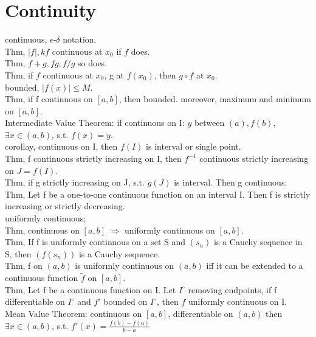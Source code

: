 \documentclass[paper=a4, fontsize=11pt]{scrartcl} %
\numberwithin{equation}{section} %
\numberwithin{figure}{section} %
\numberwithin{table}{section} %
\begin{document}
\section{Continuity}
continuous, $\epsilon$-$\delta$ notation.\\
Thm, $|f|,kf$ continuous at $x_0$ if $f$ does.\\
Thm, $f+g, fg, f/g$ so does.\\
Thm, if $f$ continuous at $x_0$, g at $f(x_0)$, then $g\circ f$ at $x_0$.\\
bounded, $|f(x)|\leq M$.\\
Thm, if f continuous on $[a,b]$, then bounded. moreover, maximum and minimum on $[a,b]$.\\
Intermediate Value Theorem: if continuous on I: $y$ between $(a),f(b)$, $\exists x\in(a,b)$, s.t. $f(x)=y$.\\
corollay, continuous on I, then $f(I)$ is interval or single point.\\
Thm, f continuous strictly increasing on I, then $f^{-1}$ continuous strictly increasing on $J=f(I)$.\\
Thm, if g strictly increasing on J, s.t. $g(J)$ is interval. Then g continuous.\\
Thm, Let f be a one-to-one continuous function on an interval I. Then f is strictly increasing or strictly decreasing.\\
uniformly continuous;\\
Thm, continuous on $[a,b]$ $\Rightarrow$ uniformly continuous on $[a,b]$.\\
Thm, If f is uniformly continuous on a set S and $(s_n)$ is a Cauchy sequence in S, then $(f(s_n))$ is a Cauchy sequence.\\
Thm, f on $(a,b)$ is uniformly continuous on $(a,b)$ iff it can be extended to a continuous function $\tilde{f}$ on $[a,b]$.\\
Thm, Let f be a continuous function on I. Let $I^\circ$ removing endpoints, if f differentiable on $I^\circ$ and $f'$ bounded on $I^\circ$, then $f$ uniformly continuous on I.\\
Mean Value Theorem: continuous on $[a,b]$, differentiable on $(a,b)$ then $\exists x\in(a,b)$, s.t. $f'(x) = \frac{f(b)-f(a)}{b-a}$\\
\end{document}
